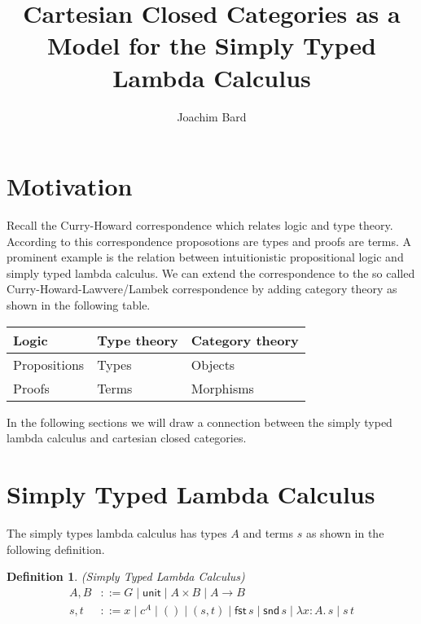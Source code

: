 \documentclass{article}
\title{Cartesian Closed Categories as a Model for the Simply Typed Lambda Calculus}
\author{Joachim Bard}
\newtheorem{defn}{Definition}[section]
\newcommand{\unit}{\mathsf{unit}}
\newcommand{\fst}{\mathsf{fst}\,}
\newcommand{\snd}{\mathsf{snd}\,}
\begin{document}
\maketitle

\section{Motivation}
\label{sec:motiv}

Recall the Curry-Howard correspondence which relates logic and type theory.
According to this correspondence proposotions are types and proofs are terms.
A prominent example is the relation between intuitionistic propositional logic and simply typed lambda calculus.
We can extend the correspondence to the so called Curry-Howard-Lawvere/Lambek correspondence by adding category theory as shown in the following table.

\begin{center}
    \begin{tabular}{l|l|l}
        Logic & Type theory & Category theory\\
        \hline
        Propositions & Types & Objects\\
        Proofs & Terms & Morphisms
    \end{tabular}
\end{center}

In the following sections we will draw a connection between the simply typed lambda calculus and cartesian closed categories.


\section{Simply Typed Lambda Calculus}

The simply types lambda calculus has types $A$ and terms $s$ as shown in the following definition.

\begin{defn}{(Simply Typed Lambda Calculus)}
    \label{def:stlc}
    \begin{align*}
        A, B & ::= G \mid \unit \mid A \times B \mid A \to B \\
        s, t & ::= x \mid c^A \mid () \mid (s, t) \mid \fst s \mid \snd s \mid \lambda x: A.\, s \mid s\, t
    \end{align*}
\end{defn}
\end{document}
